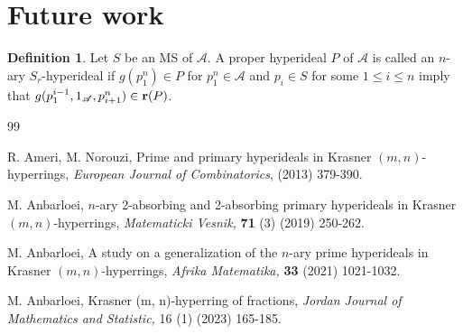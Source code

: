 \documentclass[preprint,review,10pt]{amsart}
\theoremstyle{definition}
\newtheorem{definition}[theorem]{Definition}
\theoremstyle{remark}
\numberwithin{equation}{section}
\begin{document}
\section{Future work}
\begin{definition}
Let $S$ be an MS of $\mathscr{A}$. A proper hyperideal $P$ of $\mathscr{A}$ is called an $n$-ary  $S_r$-hyperideal if  $g(p_1^n) \in P$ for   $p_1^n \in  \mathscr{A}$ and $p_i \in S$ for some $1 \leq i \leq n$ imply that $g(p_1^{i-1},1_\mathscr{A},p_{i+1}^n) \in {\bf r}(P)$. 
\end{definition}
\begin{thebibliography}{99}


R. Ameri, M. Norouzi, Prime and primary hyperideals in Krasner $(m,n)$-hyperrings, {\it European Journal of Combinatorics}, (2013) 379-390.



M. Anbarloei, $n$-ary 2-absorbing and 2-absorbing primary hyperideals in Krasner $(m,n)$-hyperrings, {\it Matematicki Vesnik,} {\bf 71} (3) (2019) 250-262. 



M. Anbarloei, A study on a generalization of the $n$-ary prime hyperideals
in Krasner $(m,n)$-hyperrings, {\it Afrika Matematika,} {\bf 33} (2021) 1021-1032. 

M. Anbarloei, Krasner (m, n)-hyperring of fractions, {\it Jordan Journal of Mathematics and Statistic,} 16 (1) (2023) 165-185.








\end{thebibliography}
\end{document}
